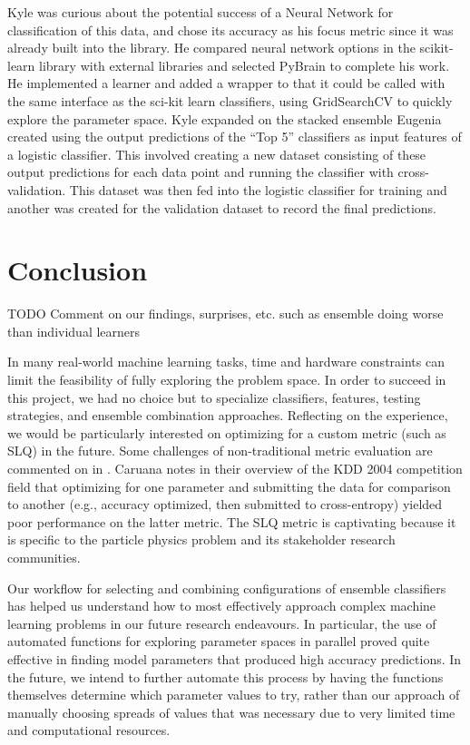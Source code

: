 \documentclass{article}
\begin{document}
Kyle was curious about the potential success of a Neural Network for classification of this data, and chose its accuracy as his focus metric since it was already built into the library. 
He compared neural network options in the scikit-learn library with external libraries and selected PyBrain to complete his work.
He implemented a learner and added a wrapper to that it could be called with the same interface as the sci-kit learn classifiers, using GridSearchCV to quickly explore the parameter space.
Kyle expanded on the stacked ensemble Eugenia created using the output predictions of the ``Top 5'' classifiers as input features of a logistic classifier.
This involved creating a new dataset consisting of these output predictions for each data point and running the classifier with cross-validation.
This dataset was then fed into the logistic classifier for training and another was created for the validation dataset to record the final predictions.



\section{Conclusion}

TODO Comment on our findings, surprises, etc.
such as ensemble doing worse than individual learners

In many real-world machine learning tasks, time and hardware constraints can limit the feasibility of fully exploring the problem space.
In order to succeed in this project, we had no choice but to specialize classifiers, features, testing strategies, and ensemble combination approaches.
Reflecting on the experience, we would be particularly interested on optimizing for a custom metric (such as SLQ) in the future.
Some challenges of non-traditional metric evaluation are commented on in \cite{vogel2004anti}.
Caruana notes in their overview of the KDD 2004 competition field \cite{caruana2004kdd} that optimizing for one parameter and submitting the data for comparison to another (e.g., accuracy optimized, then submitted to cross-entropy) yielded poor performance on the latter metric. 
The SLQ metric is captivating because it is specific to the particle physics problem and its stakeholder research communities. 

Our workflow for selecting and combining configurations of ensemble classifiers has helped us understand how to most effectively approach complex machine learning problems in our future research endeavours.
In particular, the use of automated functions for exploring parameter spaces in parallel proved quite effective in finding model parameters that produced high accuracy predictions.
In the future, we intend to further automate this process by having the functions themselves determine which parameter values to try, rather than our approach of manually choosing spreads of values that was necessary due to very limited time and computational resources.




\end{document}
